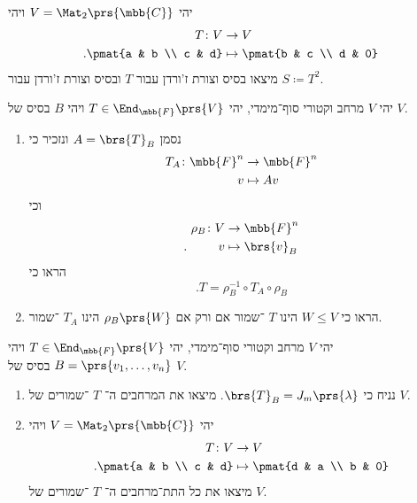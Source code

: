 \documentclass[a4paper,10pt,twoside,openany]{article}
\begin{document}
\begin{exercise}
יהי
$V = \Mat_{2}\prs{\mbb{C}}$
ויהי
\begin{align*}
T \colon V &\to V \\
\text{.} \pmat{a & b \\ c & d} &\mapsto \pmat{b & c \\ d & 0}
\end{align*}
מיצאו בסיס וצורת ז'ורדן עבור
$T$
ובסיס וצורת ז'ורדן עבור
$S \coloneqq T^2$.
\end{exercise}

\begin{exercise}
יהי
$V$
מרחב וקטורי סוף־מימדי, יהי
$T \in \End_{\mbb{F}}\prs{V}$
ויהי
$B$
בסיס של
$V$.

\begin{enumerate}
\item נסמן
$A = \brs{T}_B$
ונזכיר כי
\begin{align*}
T_A \colon \mbb{F}^n &\to \mbb{F}^n \\
v &\mapsto Av
\end{align*}
וכי
\begin{align*}
\rho_B \colon V &\to \mbb{F}^n \\
\text{.} \hphantom{lalala} v &\mapsto \brs{v}_B
\end{align*}
הראו כי
\[\text{.} T = \rho_B^{-1} \circ T_A \circ \rho_B\]

\item
הראו כי
$W \leq V$
הינו
$T$%
־שמור אם ורק אם
$\rho_B\prs{W}$
הינו
$T_A$%
־שמור.
\end{enumerate}
\end{exercise}

\begin{exercise}
יהי
$V$
מרחב וקטורי סוף־מימדי, יהי
$T \in \End_{\mbb{F}}\prs{V}$
ויהי
$B = \prs{v_1, \ldots, v_n}$
בסיס של
$V$.
\begin{enumerate}
\item נניח כי
$\brs{T}_B = J_m\prs{\lambda}$.
מיצאו את המרחבים ה־%
$T$%
־שמורים של
$V$.

\item
יהי
$V = \Mat_2\prs{\mbb{C}}$
ויהי
\begin{align*}
T \colon V &\to V \\
\text{.} \pmat{a & b \\ c & d} &\mapsto \pmat{d & a \\ b & 0}
\end{align*}
מיצאו את כל התת־מרחבים ה־%
$T$%
־שמורים של
$V$.
\end{enumerate}
\end{exercise}
\end{document}
